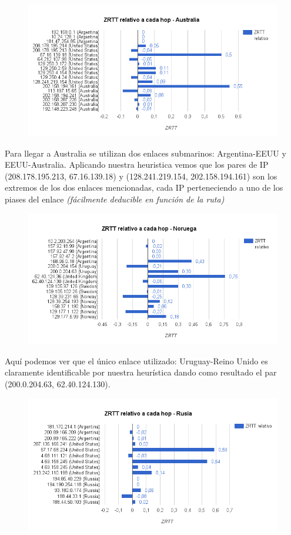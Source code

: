 \begin{figure}[H]
  \centering
    \includegraphics[width=1\textwidth]{../Experimentacion/rel-australia.png}
\end{figure}

Para llegar a Australia se utilizan dos enlaces submarinos: Argentina-EEUU y EEUU-Australia. Aplicando nuestra heuristica vemos que los pares de IP (208.178.195.213, 67.16.139.18) y (128.241.219.154, 202.158.194.161) son los extremos de los dos enlaces mencionadas, cada IP perteneciendo a uno de los piases del enlace \textit{(fácilmente deducible en función de la ruta)}

\begin{figure}[H]
  \centering
    \includegraphics[width=1\textwidth]{../Experimentacion/rel-noruega.png}
\end{figure}

Aquí podemos ver que el único enlace utilizado: Uruguay-Reino Unido es claramente identificable por nuestra heurística dando como resultado el par (200.0.204.63, 62.40.124.130).

\begin{figure}[H]
  \centering
    \includegraphics[width=1\textwidth]{../Experimentacion/rel-rusia.png}
\end{figure}

